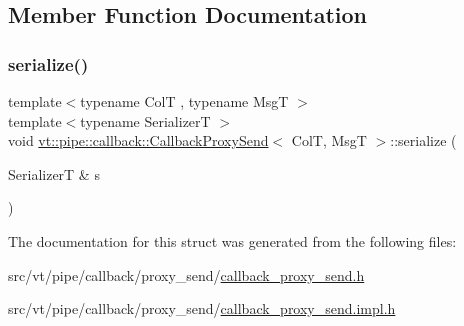 \subsection{Member Function Documentation}
\mbox{\label{structvt_1_1pipe_1_1callback_1_1_callback_proxy_send_a3f19aedbb799628c77163b440d3b6d03}} 
\subsubsection{\texorpdfstring{serialize()}{serialize()}}
{\footnotesize\ttfamily template$<$typename ColT , typename MsgT $>$ \\
template$<$typename SerializerT $>$ \\
void \hyperlink{structvt_1_1pipe_1_1callback_1_1_callback_proxy_send}{vt\+::pipe\+::callback\+::\+Callback\+Proxy\+Send}$<$ ColT, MsgT $>$\+::serialize (\begin{DoxyParamCaption}\item[{SerializerT \&}]{s }\end{DoxyParamCaption})}



The documentation for this struct was generated from the following files\+:\begin{DoxyCompactItemize}
\item 
src/vt/pipe/callback/proxy\+\_\+send/\hyperlink{callback__proxy__send_8h}{callback\+\_\+proxy\+\_\+send.\+h}\item 
src/vt/pipe/callback/proxy\+\_\+send/\hyperlink{callback__proxy__send_8impl_8h}{callback\+\_\+proxy\+\_\+send.\+impl.\+h}\end{DoxyCompactItemize}
